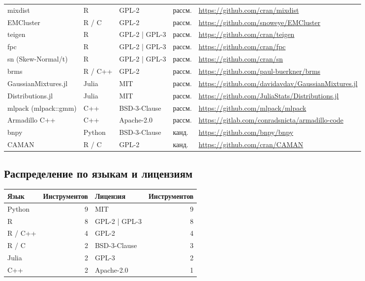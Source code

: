 \documentclass[10pt,a4paper]{article}
\begin{document}
{\begin{longtable}{@{}>{\raggedright\arraybackslash}p{4.2cm} >{\raggedright\arraybackslash}p{1.8cm} >{\raggedright\arraybackslash}p{2.3cm} l >{\raggedright\arraybackslash}p{6.2cm}@{}}
mixdist & R & GPL-2 & рассм. & \url{https://github.com/cran/mixdist} \\
EMCluster & R / C & GPL-2 & рассм. & \url{https://github.com/snoweye/EMCluster} \\
teigen & R & GPL-2 | GPL-3 & рассм. & \url{https://github.com/cran/teigen} \\
fpc & R & GPL-2 | GPL-3 & рассм. & \url{https://github.com/cran/fpc} \\
sn (Skew-Normal/t) & R & GPL-2 | GPL-3 & рассм. & \url{https://github.com/cran/sn} \\
brms & R / C++ & GPL-2 & рассм. & \url{https://github.com/paul-buerkner/brms} \\
GaussianMixtures.jl & Julia & MIT & рассм. & \url{https://github.com/davidavdav/GaussianMixtures.jl} \\
Distributions.jl & Julia & MIT & рассм. & \url{https://github.com/JuliaStats/Distributions.jl} \\
mlpack (mlpack::gmm) & C++ & BSD-3-Clause & рассм. & \url{https://github.com/mlpack/mlpack} \\
Armadillo C++ & C++ & Apache-2.0 & рассм. & \url{https://gitlab.com/conradsnicta/armadillo-code} \\
bnpy & Python & BSD-3-Clause & канд. & \url{https://github.com/bnpy/bnpy} \\
CAMAN & R / C & GPL-2 & канд. & \url{https://github.com/cran/CAMAN} \\
\bottomrule
\end{longtable}}

\subsection{Распределение по языкам и лицензиям}
\begin{center}\small
\begin{tabular}{@{}l r l r@{}}
\toprule
Язык & Инструментов & Лицензия & Инструментов \\
\midrule
Python & 9 & MIT & 9 \\
R & 8 & GPL-2 | GPL-3 & 8 \\
R / C++ & 4 & GPL-2 & 4 \\
R / C & 2 & BSD-3-Clause & 3 \\
Julia & 2 & GPL-3 & 2 \\
C++ & 2 & Apache-2.0 & 1 \\
\bottomrule
\end{tabular}
\end{center}
\end{document}
